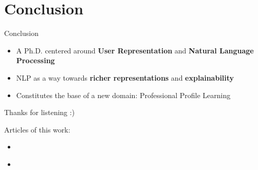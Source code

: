 \section{Conclusion}

    \begin{frame}{Conclusion}
        \begin{itemize}
            \item A Ph.D. centered around \textbf{User Representation} and \textbf{Natural Language Processing}
            \item NLP as a way towards \textbf{richer representations} and \textbf{explainability}
            \item Constitutes the base of a new domain: Professional Profile Learning
        \end{itemize}
    \end{frame}
    
    \begin{frame}{Thanks for listening :)}
        
        \flushleft Articles of this work:
        \begin{itemize}
            \item {}\\
            \item  {}
        \end{itemize}
       

    \end{frame}